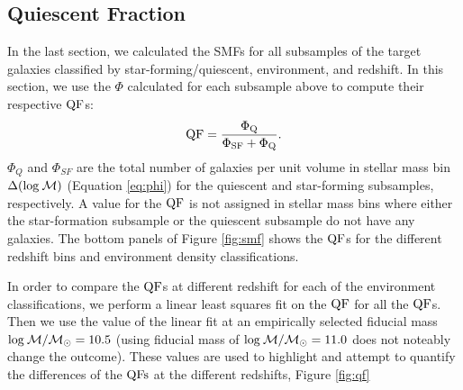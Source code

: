 \documentclass{emulateapj}
\begin{document}

\subsection{Quiescent Fraction} \label{sec:qf_const}
In the last section, we calculated the SMFs for all subsamples of the target galaxies classified by star-forming/quiescent, environment, and redshift. 
In this section, we use the $\Phi$ calculated for each subsample above to compute their respective $\rm{QF}$s: 
\begin{equation}
\rm{QF} = \frac{\Phi_{Q}}{\Phi_{SF}+\Phi_{Q}}.
\end{equation}
$\Phi_{Q}$ and $\Phi_{SF}$ are the total number of galaxies per unit volume in stellar mass bin $\Delta(\rm{log} \: \mathcal{M})$ (Equation \ref{eq:phi}) for the quiescent and star-forming subsamples, respectively.
A value for the $\rm{QF}$ is not assigned in stellar mass bins where either the star-formation subsample or the quiescent subsample do not have any galaxies. 
The bottom panels of Figure \ref{fig:smf} shows the $\rm{QF}$s for the different redshift bins and environment density classifications.

In order to compare the $\rm{QF}$s at different redshift for each of the environment classifications, we perform a linear least squares fit on the $\rm{QF}$ for all the $\rm{QF}$s. 
Then we use the value of the linear fit at an empirically selected fiducial mass $\rm{log} \: \mathcal{M}/\mathcal{M}_{\odot} = 10.5$ (using fiducial mass of $\rm{log} \: \mathcal{M}/
\mathcal{M}_\odot = 11.0$ does not noteably change the outcome).
These values are used to highlight and attempt to quantify the differences of the $\rm{QFs}$ at the different redshifts, Figure \ref{fig:qf}
\end{document}

